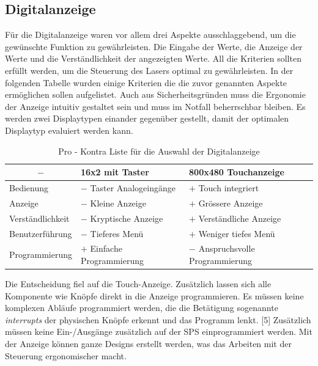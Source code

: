 \subsection{Digitalanzeige}
Für die Digitalanzeige waren vor allem drei Aspekte ausschlaggebend, um die gewünschte Funktion zu gewährleisten. Die Eingabe der Werte, die Anzeige der Werte und die Verständlichkeit der angezeigten Werte. All die Kriterien sollten erfüllt werden, um die Steuerung des Lasers optimal zu gewährleisten. In der folgenden Tabelle wurden einige Kriterien die die zuvor genannten Aspekte ermöglichen sollen aufgelistet. Auch aus Sicherheitsgründen muss die Ergonomie der Anzeige intuitiv gestaltet sein und muss im Notfall beherrschbar bleiben. Es werden zwei Displaytypen einander gegenüber gestellt, damit der optimalen Displaytyp evaluiert werden kann.

\begin{table}[H]
    \centering
    \begin{tabular}{l|l|l}
        \multicolumn{1}{c|}{$-$}&        \textbf{16x2 mit Taster}&       \textbf{800x480 Touchanzeige}\\
        \hline
        Bedienung&                      $-$ Taster Analogeingänge&      $+$ Touch integriert\\
        Anzeige&                        $-$ Kleine Anzeige&             $+$ Grössere Anzeige\\
        Verständlichkeit&               $-$ Kryptische Anzeige&         $+$ Verständliche Anzeige\\
        Benutzerführung&                $-$ Tieferes Menü&              $+$ Weniger tiefes Menü\\
        Programmierung&                 $+$ Einfache Programmierung&    $-$ Anspruchsvolle Programmierung
    \end{tabular}
    \caption{Pro - Kontra Liste für die Auswahl der Digitalanzeige}
    \label{tab:choice_display_hw}
\end{table}

Die Entscheidung fiel auf die Touch-Anzeige. Zusätzlich lassen sich alle Komponente wie Knöpfe direkt in die Anzeige programmieren. Es müssen keine komplexen Abläufe programmiert werden, die die Betätigung sogenannte \textit{interrupts} der physischen Knöpfe erkennt und das Programm lenkt. [5] Zusätzlich müssen keine Ein-/Ausgänge zusätzlich auf der SPS einprogrammiert werden. Mit der Anzeige können ganze Designs erstellt werden, was das Arbeiten mit der Steuerung ergonomischer macht.

